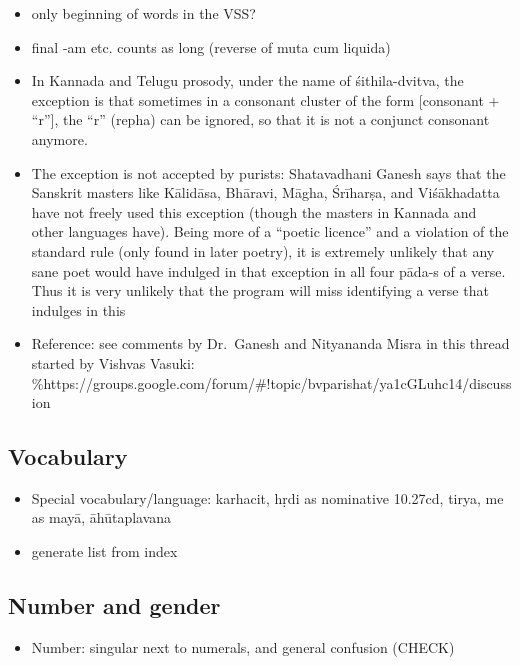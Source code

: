 \documentclass[11pt]{book}
\begin{document}
\begin{itemize}
\item
  only beginning of words in the VSS?
\item
  final -am etc. counts as long (reverse of muta cum liquida)
\item
  In Kannada and Telugu prosody, under the name of śithila-dvitva, the
  exception is that sometimes in a consonant cluster of the form
  {[}consonant + ``r''{]}, the ``r'' (repha) can be ignored, so that it
  is not a conjunct consonant anymore.
\item
  The exception is not accepted by purists: Shatavadhani Ganesh says
  that the Sanskrit masters like Kālidāsa, Bhāravi, Māgha, Śrīharṣa, and
  Viśākhadatta have not freely used this exception (though the masters
  in Kannada and other languages have). Being more of a ``poetic
  licence'' and a violation of the standard rule (only found in later
  poetry), it is extremely unlikely that any sane poet would have
  indulged in that exception in all four pāda-s of a verse. Thus it is
  very unlikely that the program will miss identifying a verse that
  indulges in this
\item
  Reference: see comments by Dr.~Ganesh and Nityananda Misra in this
  thread started by Vishvas Vasuki:
  \%https://groups.google.com/forum/\#!topic/bvparishat/ya1cGLuhc14/discussion
\end{itemize}


\subsection{Vocabulary}

\begin{itemize}

\item
  Special vocabulary/language: karhacit, hṛdi as nominative 10.27cd,
  tirya, me as mayā, āhūtaplavana
\item
  generate list from index
\end{itemize}


\subsection{Number and gender}

\begin{itemize}

\item
  Number: singular next to numerals, and general confusion (CHECK)
\end{itemize}
\end{document}
